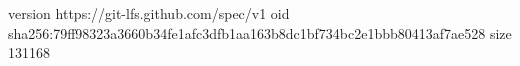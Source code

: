 version https://git-lfs.github.com/spec/v1
oid sha256:79ff98323a3660b34fe1afc3dfb1aa163b8dc1bf734bc2e1bbb80413af7ae528
size 131168
